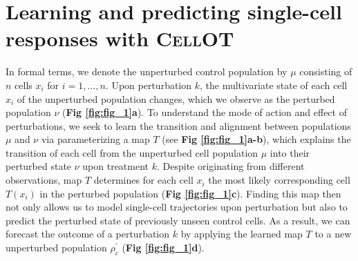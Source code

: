 \section{Learning and predicting single-cell responses with \textsc{CellOT}}


In formal terms, we denote the unperturbed control population by $\mu$ consisting of $n$ cells $x_i$ for $i = 1, \dots, n$.
Upon perturbation $k$, the multivariate state of each cell $x_i$ of the unperturbed population changes, which we observe as the perturbed population $\nu$ (\textbf{Fig \ref{fig:fig_1}a}).
To understand the mode of action and effect of perturbations, we seek to learn the transition and alignment between populations $\mu$ and $\nu$ via parameterizing a map $T$ (see \textbf{Fig \ref{fig:fig_1}a-b}), which explains the transition of each cell from the unperturbed cell population $\mu$ into their perturbed state $\nu$ upon treatment $k$.
Despite originating from  different observations, map $T$ determines for each cell $x_i$ the most likely corresponding cell $T(x_i)$ in the perturbed population (\textbf{Fig \ref{fig:fig_1}c}).
Finding this map then not only allows us to model single-cell trajectories upon perturbation but also to predict the perturbed state of previously unseen control cells.
As a result, we can forecast the outcome of a perturbation $k$  by applying the learned map $T$ to a new unperturbed population $\rho^\prime_c$ (\textbf{Fig \ref{fig:fig_1}d}).

